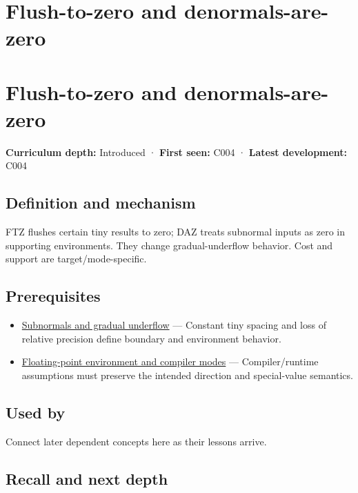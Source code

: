 \hypertarget{appendix-e979eb012782}{}
\section*{Flush-to-zero and denormals-are-zero}
\section{Flush-to-zero and denormals-are-zero}\label{appendix-e979eb012782-flush-to-zero-and-denormals-are-zero}

\textbf{Curriculum depth:} Introduced · \textbf{First seen:} C004 · \textbf{Latest development:} C004

\subsection{Definition and mechanism}\label{appendix-e979eb012782-definition-and-mechanism}

FTZ flushes certain tiny results to zero; DAZ treats subnormal inputs as zero in supporting environments. They change gradual-underflow behavior. Cost and support are target/mode-specific.

\subsection{Prerequisites}\label{appendix-e979eb012782-prerequisites}

\begin{itemize}
\tightlist
\item
  \hyperref[appendix-00a6e044c437]{Subnormals and gradual underflow} --- Constant tiny spacing and loss of relative precision define boundary and environment behavior.
\item
  \hyperref[appendix-f11d1a521253]{Floating-point environment and compiler modes} --- Compiler/runtime assumptions must preserve the intended direction and special-value semantics.
\end{itemize}

\subsection{Used by}\label{appendix-e979eb012782-used-by}

Connect later dependent concepts here as their lessons arrive.

\subsection{Recall and next depth}\label{appendix-e979eb012782-recall-and-next-depth}

